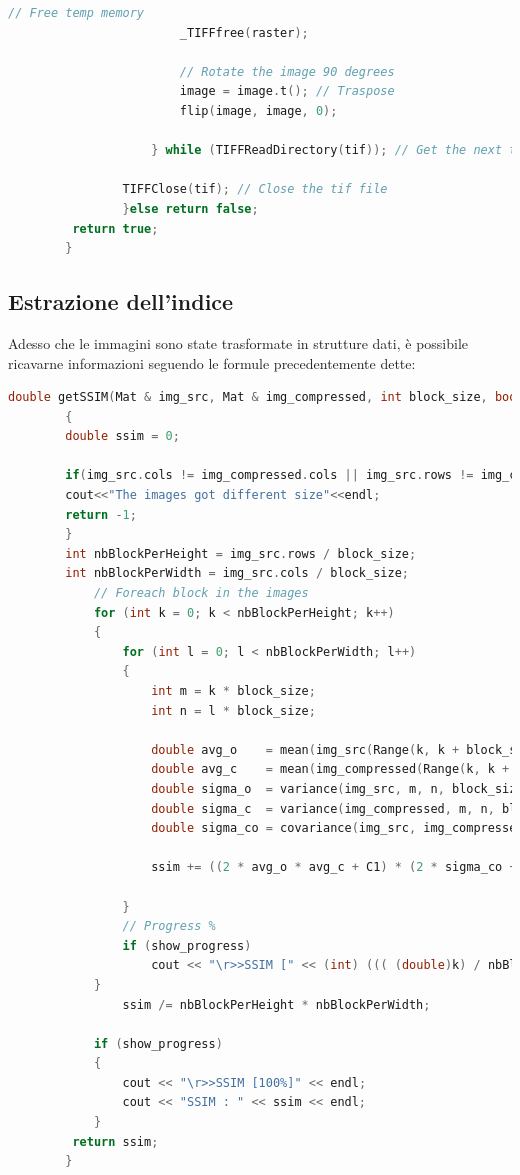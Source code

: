 \documentclass[a4paper,11pt]{article}
\begin{document}
\begin{lstlisting}[language=C++]
                        // Free temp memory
                        _TIFFfree(raster); 

                        // Rotate the image 90 degrees 
                        image = image.t(); // Traspose
                        flip(image, image, 0);
                    
                    } while (TIFFReadDirectory(tif)); // Get the next tif to go into the channels

                TIFFClose(tif); // Close the tif file
                }else return false;
         return true;
        }
    \end{lstlisting}

    \newpage

    \subsection{Estrazione dell'indice}
    Adesso che le immagini sono state trasformate in strutture dati, è possibile ricavarne informazioni seguendo le formule precedentemente dette: \\
    \begin{lstlisting}[language=C++]
        double getSSIM(Mat & img_src, Mat & img_compressed, int block_size, bool show_progress = true)
        {
        double ssim = 0;

        if(img_src.cols != img_compressed.cols || img_src.rows != img_compressed.rows){
        cout<<"The images got different size"<<endl;
        return -1;
        }
        int nbBlockPerHeight = img_src.rows / block_size;
        int nbBlockPerWidth = img_src.cols / block_size;
            // Foreach block in the images
            for (int k = 0; k < nbBlockPerHeight; k++)
            {
                for (int l = 0; l < nbBlockPerWidth; l++)
                {
                    int m = k * block_size;
                    int n = l * block_size;

                    double avg_o 	= mean(img_src(Range(k, k + block_size), Range(l, l + block_size)))[0];
                    double avg_c 	= mean(img_compressed(Range(k, k + block_size), Range(l, l + block_size)))[0];
                    double sigma_o 	= variance(img_src, m, n, block_size);
                    double sigma_c 	= variance(img_compressed, m, n, block_size);
                    double sigma_co	= covariance(img_src, img_compressed, m, n, block_size);

                    ssim += ((2 * avg_o * avg_c + C1) * (2 * sigma_co + C2)) / ((avg_o * avg_o + avg_c * avg_c + C1) * (sigma_o * sigma_o + sigma_c * sigma_c + C2));
                    
                }
                // Progress %
                if (show_progress)
                    cout << "\r>>SSIM [" << (int) ((( (double)k) / nbBlockPerHeight) * 100) << "%]";
            }
                ssim /= nbBlockPerHeight * nbBlockPerWidth;

            if (show_progress)
            {
                cout << "\r>>SSIM [100%]" << endl;
                cout << "SSIM : " << ssim << endl;
            }
         return ssim;
        }
    \end{lstlisting}
\end{document}
